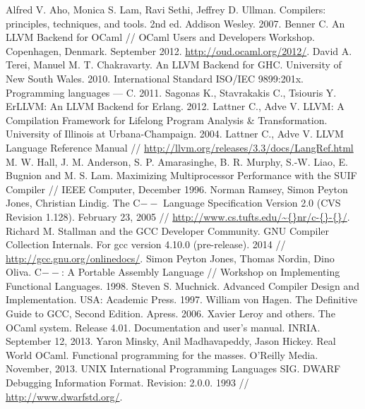 \documentclass[a4paper, 12pt]{article}
\begin{document}
\newpage
{}
\begin{thebibliography}{9001}

   Alfred V. Aho, Monica S. Lam, Ravi Sethi, Jeffrey D. Ullman. Compilers: principles, techniques, and
tools. 2nd ed. Addison Wesley. 2007.
   Benner C. An LLVM Backend for OCaml // OCaml Users and Developers Workshop. Copenhagen, Denmark.
September 2012. \url{http://oud.ocaml.org/2012/}.
   David A. Terei, Manuel M. T. Chakravarty. An LLVM Backend for GHC. University of New South Wales. 2010.
   International Standard ISO/IEC 9899:201x. Programming languages — C. 2011.
   Sagonas K., Stavrakakis C., Tsiouris Y. ErLLVM: An LLVM Backend for Erlang. 2012.
   Lattner C., Adve V. LLVM: A Compilation Framework for Lifelong Program Analysis \& Transformation.
University of Illinois at Urbana-Champaign. 2004.
   Lattner C., Adve V. LLVM Language Reference Manual //
\url{http://llvm.org/releases/3.3/docs/LangRef.html}
   M. W. Hall, J. M. Anderson, S. P. Amarasinghe, B. R. Murphy, S.-W. Liao, E. Bugnion and M. S. Lam.
Maximizing Multiprocessor Performance with the SUIF Compiler // IEEE Computer, December 1996.
   Norman Ramsey, Simon Peyton Jones, Christian Lindig. The C$--$ Language Specification Version 2.0
(CVS Revision 1.128). February 23, 2005 // \url{http://www.cs.tufts.edu/\~{}nr/c-{}-{}/}.
   Richard M. Stallman and the GCC Developer Community. GNU Compiler Collection Internals. For gcc
version 4.10.0 (pre-release). 2014 // \url{http://gcc.gnu.org/onlinedocs/}.
   Simon Peyton Jones, Thomas Nordin, Dino Oliva. C$--$: A Portable Assembly Language // Workshop on
Implementing Functional Languages. 1998.
   Steven S. Muchnick. Advanced Compiler Design and Implementation. USA: Academic Press. 1997.
   William von Hagen. The Definitive Guide to GCC, Second Edition. Apress. 2006.
   Xavier Leroy and others. The OCaml system. Release 4.01. Documentation and user's manual. INRIA.
September 12, 2013.
   Yaron Minsky, Anil Madhavapeddy, Jason Hickey. Real World OCaml. Functional programming for the masses.
O'Reilly Media. November, 2013.
   UNIX International Programming Languages SIG. DWARF Debugging Information Format. Revision: 2.0.0.
1993 // \url{http://www.dwarfstd.org/}.

\end{thebibliography}

\newpage
\end{document}
